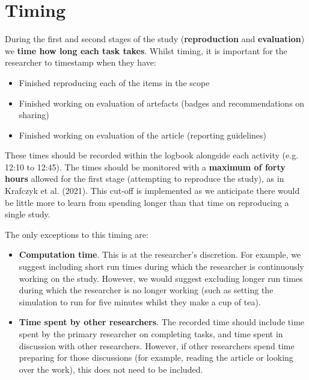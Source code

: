\vspace{1cm}
\section{Timing} \label{sec:timing}

During the first and second stages of the study (\textbf{reproduction} and \textbf{evaluation}) we \textbf{time how long each task takes}. Whilst timing, it is important for the researcher to timestamp when they have:
\begin{itemize}
    \item Finished reproducing each of the items in the scope
    \item Finished working on evaluation of artefacts (badges and recommendations on sharing)
    \item Finished working on evaluation of the article (reporting guidelines)
\end{itemize}

These times should be recorded within the logbook alongside each activity (e.g. 12:10 to 12:45). The times should be monitored with a \textbf{maximum of forty hours} allowed for the first stage (attempting to reproduce the study), as in Krafczyk et al. (2021).\autocite{krafczyk_learning_2021} This cut-off is implemented as we anticipate there would be little more to learn from spending longer than that time on reproducing a single study.

The only exceptions to this timing are:
\begin{itemize}
    \item \textbf{Computation time}. This is at the researcher's discretion. For example, we suggest including short run times during which the researcher is continuously working on the study. However, we would suggest excluding longer run times during which the researcher is no longer working (such as setting the simulation to run for five minutes whilst they make a cup of tea).
    \item \textbf{Time spent by other researchers}. The recorded time should include time spent by the primary researcher on completing tasks, and time spent in discussion with other researchers. However, if other researchers spend time preparing for those discussions (for example, reading the article or looking over the work), this does not need to be included.
\end{itemize}